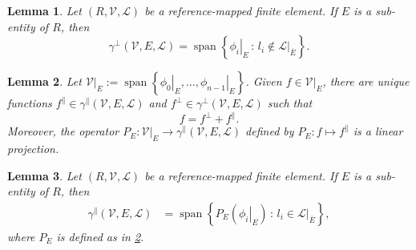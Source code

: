 \documentclass[10pt,a4paper]{amsart}
\newtheorem{lemma}{Lemma}
\newcommand{\closure}[1]{\overline{#1}}
\newcommand{\ctrace}[3]{\gamma^\parallel(#1,#2,#3)}
\newcommand{\dualbasis}{\mathcal{L}}
\newcommand{\polyspace}{\mathcal{V}}
\newcommand{\refel}{R}
\newcommand{\subentity}{E}
\newcommand{\unctrace}[3]{\gamma^\perp(#1,#2,#3)}
\begin{document}
\begin{lemma}\label{lemma:first-unc}
Let $(\refel,\polyspace,\dualbasis)$ be a reference-mapped finite element.
If $\subentity$ is a sub-entity of $\refel$, then
\[
\unctrace{\polyspace}{\subentity}{\dualbasis} =
\operatorname{span}\left\{\left.\phi_i\right|_{\subentity}\,:\,l_i\not\in\left.\dualbasis\right|_{\closure{\subentity}}\right\}.
\]
\end{lemma}

\begin{lemma}\label{lemma:zeroth}
Let \(\left.\polyspace\right|_{\subentity}:=\operatorname{span}\left\{\left.\phi_0\right|_{\subentity},\dots,\left.\phi_{n-1}\right|_{\subentity}\right\}\).
Given $f\in\left.\polyspace\right|_{\subentity}$, there are unique functions
$f^\parallel\in\ctrace{\polyspace}{\subentity}{\dualbasis}$
and
$f^\perp\in\unctrace{\polyspace}{\subentity}{\dualbasis}$
such that
\[f=f^\perp+f^\parallel.\]
Moreover, the operator $P_{\subentity}:\left.\polyspace\right|_{\subentity}\to\ctrace{\polyspace}{\subentity}{\dualbasis}$
defined by $P_{\subentity}:f\mapsto f^\parallel$ is a linear projection.
\end{lemma}

\begin{lemma}\label{lemma:first-c}
Let $(\refel,\polyspace,\dualbasis)$ be a reference-mapped finite element.
If $\subentity$ is a sub-entity of $\refel$, then
\begin{align*}
\ctrace{\polyspace}{\subentity}{\dualbasis} &=
\operatorname{span}\left\{P_{\subentity}\left(\left.\phi_i\right|_{\subentity}\right)
\,:\,l_i\in\left.\dualbasis\right|_{\closure{\subentity}}\right\},
\end{align*}
where \(P_{\subentity}\) is defined as in \cref{lemma:zeroth}.
\end{lemma}
\end{document}
